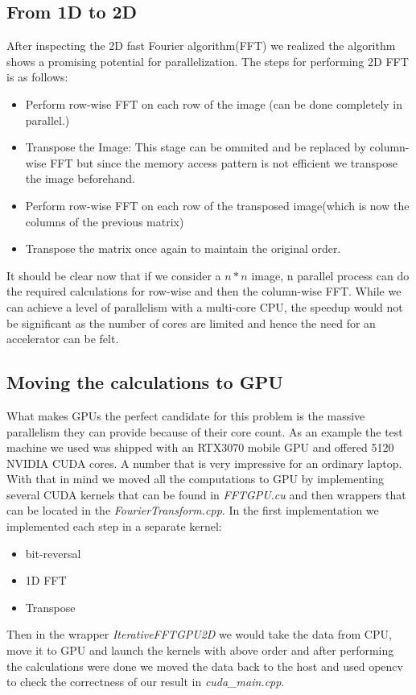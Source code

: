 \subsection{From 1D to 2D}
After inspecting the 2D fast Fourier algorithm(FFT) we realized the algorithm shows a promising potential for parallelization. The steps for performing 2D FFT is as follows: 
\begin{itemize}
\item Perform row-wise FFT on each row of the image (can be done completely in parallel.)
\item Transpose the Image: This stage can be ommited and be replaced by column-wise FFT but since the memory access pattern is not efficient we transpose the image beforehand.
\item Perform row-wise FFT on each row of the transposed image(which is now the columns of the previous matrix)
\item Transpose the matrix once again to maintain the original order.
\end{itemize}
It should be clear now that if we consider a \(n * n \) image, n parallel process can do the required calculations for row-wise and then the column-wise FFT. While we can achieve a level of parallelism with a multi-core CPU, the speedup would not be significant as the number of cores are limited and hence the need for an accelerator can be felt.
\subsection{Moving the calculations to GPU}
What makes GPUs the perfect candidate for this problem is the massive parallelism they can provide because of their core count. As an example the test machine we used was shipped with an RTX3070 mobile GPU and offered 5120 NVIDIA CUDA cores. A number that is very impressive for an ordinary laptop. With that in mind we moved all the computations to GPU by implementing several CUDA kernels that can be found in \textit{FFTGPU.cu} and then wrappers that can be located in the \textit{FourierTransform.cpp}.
In the first implementation we implemented each step in a separate kernel:
\begin{itemize}
\item bit-reversal
\item 1D FFT
\item Transpose
\end{itemize}

Then in the wrapper \textit{IterativeFFTGPU2D} we would take the data from CPU, move it to GPU and launch the kernels with above order and after performing the calculations were done we moved the data back to the host and used opencv to check the correctness of our result in \textit{cuda\_main.cpp}.

